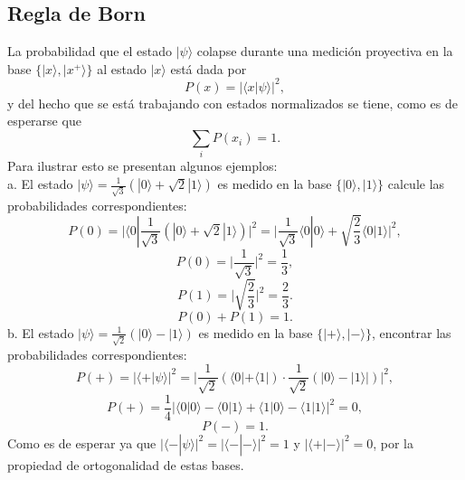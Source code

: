 \documentclass[a4paper]{article}
\begin{document}
\subsection{Regla de Born}
La probabilidad que el estado $|\psi\rangle$ colapse durante una medición proyectiva en la base $\{|x\rangle, |x^+ \rangle \}$ al estado $|x\rangle$ está dada por
\begin{equation*}
P(x)=|\langle x|\psi\rangle|^2,
\end{equation*}
y del hecho que se está trabajando con estados normalizados se tiene, como es de esperarse que
\begin{equation*}
\sum_i P(x_i)=1.
\end{equation*}
Para ilustrar esto se presentan algunos ejemplos:\\
a. El estado $|\psi\rangle=\frac{1}{\sqrt{3}}(|0\rangle +\sqrt{2}|1\rangle)$ es medido en la base $\{|0\rangle,   |1\rangle \}$ calcule las probabilidades correspondientes:
\begin{equation*}
P(0)=\bigg |\langle 0|\frac{1}{\sqrt{3}}(|0\rangle +\sqrt{2}|1\rangle)\bigg |^2=\bigg|\frac{1}{\sqrt{3}}\langle 0|0\rangle+\sqrt{\frac{2}{3}}\langle 0|1\rangle \bigg |^2,
\end{equation*}
\begin{equation*}
P(0)=\bigg|\frac{1}{\sqrt{3}} \bigg|^2=\frac{1}{3},
\end{equation*}
\begin{equation*}
P(1)=\bigg|\sqrt{\frac{2}{3}} \bigg|^2=\frac{2}{3}.
\end{equation*}
\begin{equation*}
P(0)+P(1)=1.
\end{equation*}
b. El estado $|\psi\rangle=\frac{1}{\sqrt{2}}(|0\rangle-|1\rangle)$ es medido en la base $\{|+\rangle, |-\rangle\}$, encontrar las probabilidades correspondientes:
\begin{equation*}
P(+)=\bigg| \langle +|\psi\rangle\bigg|^2=\bigg|\frac{1}{\sqrt{2}}(\langle 0| +\langle 1|)\cdot \frac{1}{\sqrt{2}}(|0\rangle -|1\rangle|)\bigg|^2 ,
\end{equation*}
\begin{equation*}
P(+)=\frac{1}{4}\bigg|\langle 0|0\rangle-\langle 0|1\rangle+\langle 1|0\rangle-\langle 1|1\rangle\bigg|^2=0 ,
\end{equation*}
\begin{equation*}
P(-)=1.
\end{equation*}
Como es de esperar ya que $\bigg| \langle -|\psi\rangle\bigg|^2=\bigg| \langle -|-\rangle\bigg|^2=1$ y $\bigg| \langle +|-\rangle\bigg|^2=0$, por la propiedad de ortogonalidad de estas bases.
\end{document}
